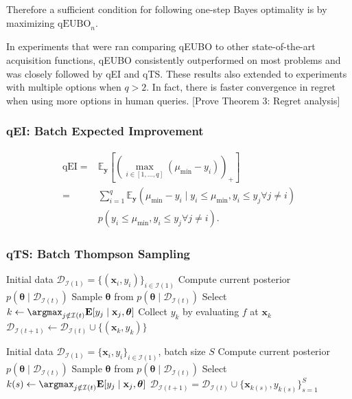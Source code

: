 \documentclass[
  letterpaper,
  DIV=11,
  numbers=noendperiod,
  oneside]{scrreprt}
\theoremstyle{remark}
\begin{document}
Therefore a sufficient condition for following one-step Bayes optimality
is by maximizing \(\text{qEUBO}_n\).

In experiments that were ran comparing qEUBO to other state-of-the-art
acquisition functions, qEUBO consistently outperformed on most problems
and was closely followed by qEI and qTS. These results also extended to
experiments with multiple options when \(q>2\). In fact, there is faster
convergence in regret when using more options in human queries. {[}Prove
Theorem 3: Regret analysis{]}

\subsubsection*{qEI: Batch Expected
Improvement}\label{qei-batch-expected-improvement}

\[\begin{aligned}
\mathrm{qEI}= & \mathbb{E}_{\mathbf{y}}\left[\left(\max _{i \in[1, \ldots, q]}\left(\mu_{\min }-y_i\right)\right)_{+}\right] \\
= & \sum_{i=1}^q \mathbb{E}_{\mathbf{y}}\left(\mu_{\min }-y_i \mid y_i \leq \mu_{\min }, y_i \leq y_j \forall j \neq i\right) \\
& p\left(y_i \leq \mu_{\min }, y_i \leq y_j \forall j \neq i\right) .
\end{aligned}\]

\subsubsection*{qTS: Batch Thompson
Sampling}\label{qts-batch-thompson-sampling}

Initial data
\(\mathcal{D}_{\mathcal{I}(1)}=\{(\mathbf{x}_i, y_i)\}_{i \in \mathcal{I}(1)}\)
Compute current posterior
\(p(\boldsymbol{\theta} \mid \mathcal{D}_{\mathcal{I}(t)})\) Sample
\(\boldsymbol{\theta}\) from
\(p(\boldsymbol{\theta} \mid \mathcal{D}_{\mathcal{I}(t)})\) Select
\(k \leftarrow \argmax_{j \notin \mathcal{I}(t)} \mathbf{E}[y_j \mid \mathbf{x}_j, \boldsymbol{\theta}]\)
Collect \(y_k\) by evaluating \(f\) at \(\mathbf{x}_k\)
\(\mathcal{D}_{\mathcal{I}(t+1)} \leftarrow \mathcal{D}_{\mathcal{I}(t)} \cup \{(\mathbf{x}_k, y_k)\}\)

Initial data
\(\mathcal{D}_{\mathcal{I}(1)}=\{\mathbf{x}_i, y_i\}_{i \in \mathcal{I}(1)}\),
batch size \(S\) Compute current posterior
\(p(\boldsymbol{\theta} \mid \mathcal{D}_{\mathcal{I}(t)})\) Sample
\(\boldsymbol{\theta}\) from
\(p(\boldsymbol{\theta} \mid \mathcal{D}_{\mathcal{I}(t)})\) Select
\(k(s) \leftarrow \argmax_{j \notin \mathcal{I}(t)} \mathbf{E}[y_j \mid \mathbf{x}_j, \boldsymbol{\theta}]\)
\(\mathcal{D}_{\mathcal{I}(t+1)} = \mathcal{D}_{\mathcal{I}(t)} \cup \{\mathbf{x}_{k(s)}, y_{k(s)}\}_{s=1}^S\)
\end{document}
